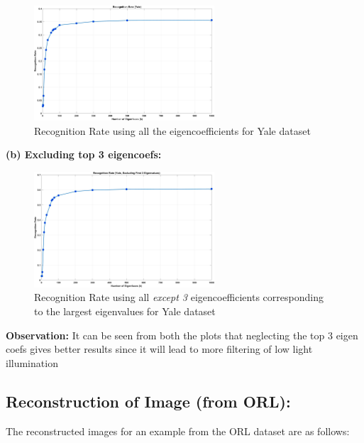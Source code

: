 \documentclass{article}
\begin{document}
\begin{figure}[!htb]
    \centering
    \includegraphics[width=0.6\textwidth]{recog_yale.png}
    \caption{Recognition Rate using all the eigencoefficients for Yale dataset}
\end{figure}

\textbf{(b) Excluding top 3 eigencoefs:}

\begin{figure}[!htb]
    \centering
    \includegraphics[width=0.6\textwidth]{recog_yale_excluded.png}
    \caption{Recognition Rate using all \textit{except 3} eigencoefficients corresponding to the largest eigenvalues for Yale dataset}
\end{figure}

\textbf{Observation:} It can be seen from both the plots that neglecting the top 3 eigen coefs gives better results since it will lead to more filtering of low light illumination

\newpage
\subsection*{Reconstruction of Image (from ORL):}

The reconstructed images for an example from the ORL dataset are as follows:
\end{document}
